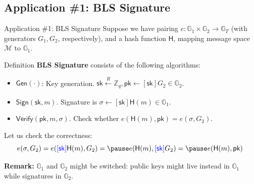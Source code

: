 \documentclass[xcolor={usenames,dvipsnames}]{beamer}
\begin{document}
    \subsection{Application \#1: BLS Signature}
    \begin{frame}{Application \#1: BLS Signature}
        Suppose we have pairing $e: \mathbb{G}_1 \times \mathbb{G}_2 \to \mathbb{G}_T$ (with generators $G_1,G_2$, respectively), and a hash function $\mathsf{H}$, mapping message space $\mathcal{M}$ to $\mathbb{G}_1$.
        \pause
        \begin{block}{Definition}
            \textbf{BLS Signature} consists of the following algorithms:
            \begin{itemize}
                \item $\mathsf{Gen}(\cdot)$: Key generation. $\mathsf{sk} \xleftarrow[]{R} \mathbb{Z}_q, \mathsf{pk} \gets [\mathsf{sk}] G_2 \in \mathbb{G}_2$.\pause
                \item $\mathsf{Sign}(\mathsf{sk},m)$. Signature is $\sigma \gets [\mathsf{sk}] \mathsf{H}(m) \in \mathbb{G}_1$.\pause
                \item $\mathsf{Verify}(\mathsf{pk},m,\sigma)$. Check whether $e(\mathsf{H}(m), \mathsf{pk}) = e(\sigma, G_2)$. \pause
            \end{itemize}
        \end{block}
        
        Let us check the correctness:
        \begin{equation*}
            e(\sigma,G_2) = e(\textcolor{blue}{[\mathsf{sk}]}\mathsf{H}(m),G_2) =\pause e(\mathsf{H}(m), \textcolor{blue}{[\mathsf{sk}]}G_2) =\pause e(\mathsf{H}(m), \mathsf{pk})
        \end{equation*}
        
        \pause\textbf{Remark:} $\mathbb{G}_1$ and $\mathbb{G}_2$ might be switched: public keys might live instead in $\mathbb{G}_1$ while signatures in $\mathbb{G}_2$.
    \end{frame}
\end{document}
